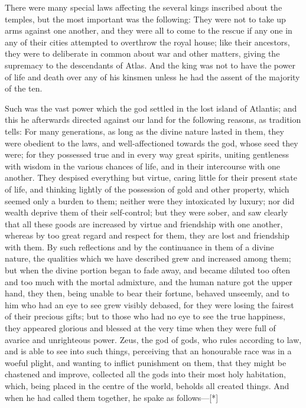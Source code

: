 \documentclass[11pt,letter]{article}
\begin{document}
\par  There were many special laws affecting the several kings inscribed about the temples, but the most important was the following: They were not to take up arms against one another, and they were all to come to the rescue if any one in any of their cities attempted to overthrow the royal house; like their ancestors, they were to deliberate in common about war and other matters, giving the supremacy to the descendants of Atlas. And the king was not to have the power of life and death over any of his kinsmen unless he had the assent of the majority of the ten.

\par  Such was the vast power which the god settled in the lost island of Atlantis; and this he afterwards directed against our land for the following reasons, as tradition tells: For many generations, as long as the divine nature lasted in them, they were obedient to the laws, and well-affectioned towards the god, whose seed they were; for they possessed true and in every way great spirits, uniting gentleness with wisdom in the various chances of life, and in their intercourse with one another. They despised everything but virtue, caring little for their present state of life, and thinking lightly of the possession of gold and other property, which seemed only a burden to them; neither were they intoxicated by luxury; nor did wealth deprive them of their self-control; but they were sober, and saw clearly that all these goods are increased by virtue and friendship with one another, whereas by too great regard and respect for them, they are lost and friendship with them. By such reflections and by the continuance in them of a divine nature, the qualities which we have described grew and increased among them; but when the divine portion began to fade away, and became diluted too often and too much with the mortal admixture, and the human nature got the upper hand, they then, being unable to bear their fortune, behaved unseemly, and to him who had an eye to see grew visibly debased, for they were losing the fairest of their precious gifts; but to those who had no eye to see the true happiness, they appeared glorious and blessed at the very time when they were full of avarice and unrighteous power. Zeus, the god of gods, who rules according to law, and is able to see into such things, perceiving that an honourable race was in a woeful plight, and wanting to inflict punishment on them, that they might be chastened and improve, collected all the gods into their most holy habitation, which, being placed in the centre of the world, beholds all created things. And when he had called them together, he spake as follows—[*]
 
\par 
 
\end{document}
